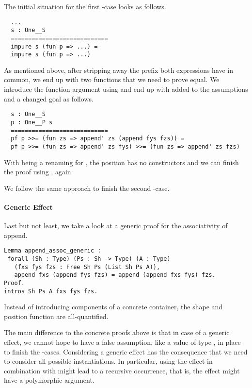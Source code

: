 The initial situation for the first -case looks as
follows.

\begin{verbatim}
  ...
  s : One__S
  ============================
  impure s (fun p => ...) =
  impure s (fun p => ...)
\end{verbatim}

As mentioned above, after stripping away the prefix both expressions
have in common, we end up with two functions that we need to prove
equal.
We introduce the function argument  using  and end up with  added to the assumptions and a changed
goal as follows.

\begin{verbatim}
  s : One__S
  p : One__P s
  ============================
  pf p >>= (fun zs => append' zs (append fys fzs)) =
  pf p >>= (fun zs => append' zs fys) >>= (fun zs => append' zs fzs)
\end{verbatim}

With  being a renaming for , the position
 has no constructors and we can finish the proof using
, again.

We follow the same approach to finish the second -case.

\paragraph{Generic Effect}
Last but not least, we take a look at a generic proof for the
associativity of append.

\begin{verbatim}
Lemma append_assoc_generic :
 forall (Sh : Type) (Ps : Sh -> Type) (A : Type)
   (fxs fys fzs : Free Sh Ps (List Sh Ps A)),
   append fxs (append fys fzs) = append (append fxs fys) fzs.
Proof.
intros Sh Ps A fxs fys fzs.
\end{verbatim}

Instead of introducing components of a concrete container, the shape
 and position function  are all-quantified.

The main difference to the concrete proofs above is that in case of a
generic effect, we cannot hope to have a false assumption, like a
value of type , in place to finish the
-cases.
Considering a generic effect has the consequence that we need to
consider all possible instantiations.
In particular, using the effect in combination with  might
lead to a recursive occurrence, that is, the effect might have a
polymorphic argument.

